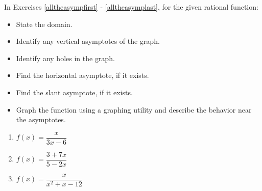 \documentclass{ximera}
\begin{document}
\begin{multicols}{2}
\begin{enumerate}
\setcounter{HW}{\value{enumi}}

\end{enumerate}

\end{multicols}



In Exercises \ref{alltheasympfirst} - \ref{alltheasymplast}, for the given rational function:

\begin{multicols}{2}
\begin{itemize}

\item State the domain.
\item Identify any vertical asymptotes of the graph.

\end{itemize}
\end{multicols}

\begin{multicols}{2}
\begin{itemize}

\item Identify any holes in the graph.
\item Find the horizontal asymptote, if it exists.

\end{itemize}
\end{multicols}

\begin{multicols}{2}
\begin{itemize}

\item Find the slant asymptote, if it exists.
\item Graph the function using a graphing utility and describe the behavior near the asymptotes.

\end{itemize}
\end{multicols}

\begin{multicols}{3}
\begin{enumerate}
\setcounter{enumi}{\value{HW}}

\item $f(x) = \dfrac{x}{3x - 6}$ \label{alltheasympfirst}
\item $f(x) = \dfrac{3 + 7x}{5 - 2x}$
\item $f(x) = \dfrac{x}{x^{2} + x - 12}$

\setcounter{HW}{\value{enumi}}
\end{enumerate}
\end{multicols}
\end{document}

